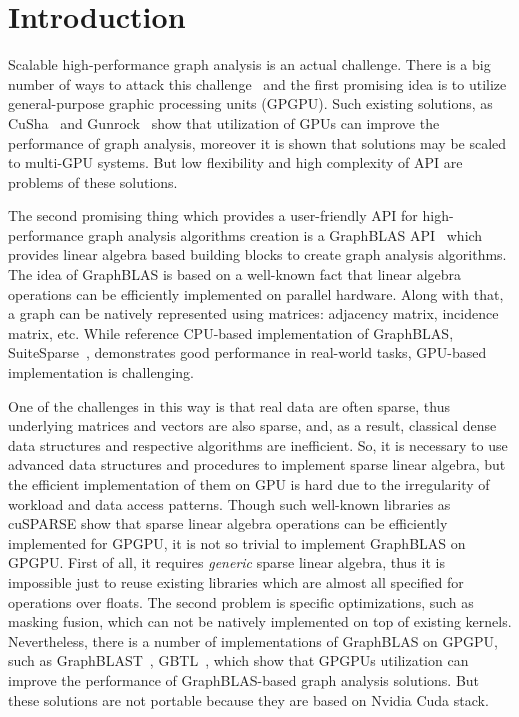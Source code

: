 \section{Introduction}

Scalable high-performance graph analysis is an actual challenge.
There is a big number of ways to attack this challenge~\cite{Coimbra2021} and the first promising idea is to utilize general-purpose graphic processing units (GPGPU).
Such existing solutions, as CuSha~\cite{10.1145/2600212.2600227} and Gunrock~\cite{7967137} show that utilization of GPUs can improve the performance of graph analysis, moreover it is shown that solutions may be scaled to multi-GPU systems.
But low flexibility and high complexity of API are problems of these solutions.

The second promising thing which provides a user-friendly API for high-performance graph analysis algorithms creation is a GraphBLAS API~\cite{7761646} which provides linear algebra based building blocks to create graph analysis algorithms.
The idea of GraphBLAS is based on a well-known fact that linear algebra operations can be efficiently implemented on parallel hardware.
Along with that, a graph can be natively represented using matrices: adjacency matrix, incidence matrix, etc.
While reference CPU-based implementation of GraphBLAS, SuiteSparse~\cite{10.1145/3322125}, demonstrates good performance in real-world tasks, GPU-based implementation is challenging.

One of the challenges in this way is that real data are often sparse, thus underlying matrices and vectors are also sparse, and, as a result, classical dense data structures and respective algorithms are inefficient. 
So, it is necessary to use advanced data structures and procedures to implement sparse linear algebra, but the efficient implementation of them on GPU is hard due to the irregularity of workload and data access patterns.
Though such well-known libraries as cuSPARSE show that sparse linear algebra operations can be efficiently implemented for GPGPU, it is not so trivial to implement GraphBLAS on GPGPU. 
First of all, it requires \textit{generic} sparse linear algebra, thus it is impossible just to reuse existing libraries which are almost all specified for operations over floats.
The second problem is specific optimizations, such as masking fusion, which can not be natively implemented on top of existing kernels.
Nevertheless, there is a number of implementations of GraphBLAS on GPGPU, such as GraphBLAST~\cite{yang2019graphblast}, GBTL~\cite{7529957}, which show that GPGPUs utilization can improve the performance of GraphBLAS-based graph analysis solutions.
But these solutions are not portable because they are based on Nvidia Cuda stack.

